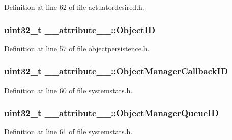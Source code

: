 \-Definition at line 62 of file actuatordesired.\-h.

\hypertarget{struct____attribute_____a77530b31cea5b97dcdc3e35af7b4390a}{
\subsubsection[{\-Object\-I\-D}]{\setlength{\rightskip}{0pt plus 5cm}uint32\-\_\-t {\bf \-\_\-\-\_\-attribute\-\_\-\-\_\-\-::\-Object\-I\-D}}}\label{struct____attribute_____a77530b31cea5b97dcdc3e35af7b4390a}


\-Definition at line 57 of file objectpersistence.\-h.

\hypertarget{struct____attribute_____a42225757f9652bc3b71e4a960411d0f6}{
\subsubsection[{\-Object\-Manager\-Callback\-I\-D}]{\setlength{\rightskip}{0pt plus 5cm}uint32\-\_\-t {\bf \-\_\-\-\_\-attribute\-\_\-\-\_\-\-::\-Object\-Manager\-Callback\-I\-D}}}\label{struct____attribute_____a42225757f9652bc3b71e4a960411d0f6}


\-Definition at line 60 of file systemstats.\-h.

\hypertarget{struct____attribute_____a89ea27880d9f09eb5d092599448f2305}{
\subsubsection[{\-Object\-Manager\-Queue\-I\-D}]{\setlength{\rightskip}{0pt plus 5cm}uint32\-\_\-t {\bf \-\_\-\-\_\-attribute\-\_\-\-\_\-\-::\-Object\-Manager\-Queue\-I\-D}}}\label{struct____attribute_____a89ea27880d9f09eb5d092599448f2305}


\-Definition at line 61 of file systemstats.\-h.

